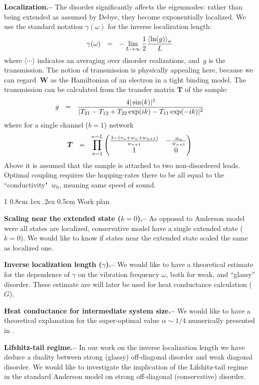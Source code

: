 \documentclass[onecolumn,fleqn,notitlepage,secnumarabic]{revtex4}
\makeatletter
\newcommand{\amatrix}[1]{\begin{matrix} #1 \end{matrix}}
\newcommand{\be}[1]{\begin{eqnarray}\ifthenelse{#1=-1}{\nonumber}{\ifthenelse{#1=0}{}{\label{e#1}}}}
\newcommand{\ee}{\end{eqnarray}}
\newcommand{\beq}{\be{1}}
\newcommand{\eeq}{\ee}
\newcommand{\sect}[1]{{\bf #1.-- }}
\def\section{%
  \@startsection
    {section}%
    {1}%
    {\z@}%
    {0.8cm \@plus1ex \@minus .2ex}%
    {0.5cm}%
    {\Large\bf }%
}%
\makeatother
\begin{document}
\sect{Localization}
%
The disorder significantly affects the eigenmodes: rather than being extended 
as assumed by Debye, they become exponentially localized. 
We use the standard notation $\gamma(\omega)$ for the inverse localization length: 
%
\beq
\label{eq:locdef}
\gamma(\omega) \ \ = \ \ -\lim_{L\rightarrow \infty}{1\over 2}{\langle \ln(g) \rangle_{\omega} \over L}
\eeq
%
where $\langle\cdots\rangle$ indicates an averaging over disorder realizations, 
and~$g$ is the transmission. The notion of transmission is physically appealing here,  
because we can regard~$\bm{W}$ as the Hamiltonian of an electron in a tight binding model. 
The transmission can be calculated from the transfer matrix $\bm{T}$ of the sample:
%
\beq
\label{eq:gTMM}
g \ \ = \ \ \frac{4|\sin(k)|^2}{|T_{21}-T_{12}+T_{22}\exp(ik)-T_{11}\exp(-ik)|^2}
\eeq
%
where for a single channel ($b=1$) network
%
\be{5}\label{eq:TM}
\bm{T} \ \ = \ \ \prod_{n=1}^{n=L} 
\left(\amatrix{
\frac{\lambda-(v_n + w_{n}+w_{n+1})}{w_{n+1}} & -\frac{w_{n}}{w_{n+1}} \cr 1 & 0 
}\right)
\eeq
%
Above it is assumed that the sample is attached to two non-disordered leads.
Optimal coupling requires the hopping-rates there to be all equal 
to the ``conductivity"~$w_0$, meaning same speed of sound. 



\section{Work plan}

\sect{Scaling near the extended state ($k=0$)} 
As opposed to Anderson model were all states are localized, conservative model have a single extended state ($k=0$). We would like to know if states near the extended state scaled the same as localized one.

\sect{Inverse localization length ($\gamma$)}
We would like to have a theoretical estimate for the dependence of $\gamma$ on the vibration frequency $\omega$,  both for weak, and ``glassy'' disorder. These estimate are will later be used for heat conductance calculation ($G$).

\sect{Heat conductance for intermediate system size}
We would like to have a theoretical explanation for the super-optimal value $\alpha \sim 1/4$ numerically presented in \cite{BZFK13}.

\sect{Lifshitz-tail regime} In our work on the inverse localization length we have deduce a duality between strong (glassy) off-diagonal disorder and weak diagonal disorder. We would like to investigate the implication of the
Lifshitz-tail regime in the standard Anderson model on strong off-diagonal (conservative) disorder.
\end{document}
